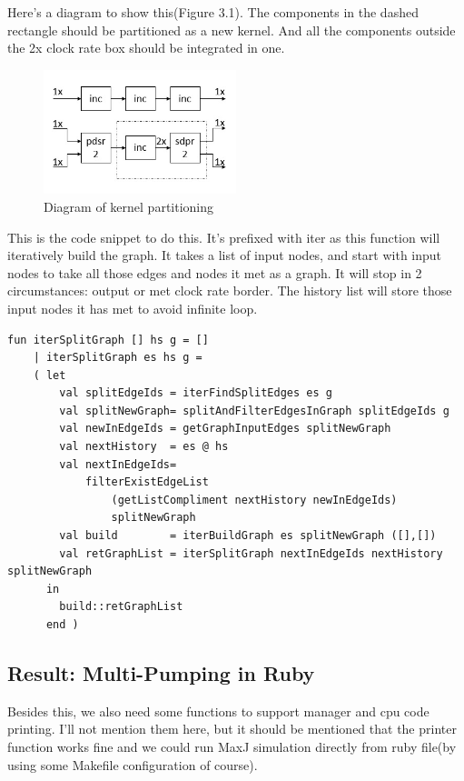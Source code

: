\documentclass[a4paper, 10pt]{report}
\begin{document}
Here's a diagram to show this(Figure 3.1). The components in the dashed rectangle should be partitioned as a new kernel. And all the components outside the 2x clock rate box should be integrated in one. 

\begin{figure}[h!]
  \caption{Diagram of kernel partitioning}
  \centering
    \includegraphics[width=0.5\textwidth]{pdsr}
\end{figure}

This is the code snippet to do this. It's prefixed with iter as this function will iteratively build the graph. It takes a list of input nodes, and start with input nodes to take all those edges and nodes it met as a graph. It will stop in 2 circumstances: output or met clock rate border. The history list will store those input nodes it has met to avoid infinite loop.

\begin{lstlisting}[caption=Iter partitioning algorithm]
fun iterSplitGraph [] hs g = []
    | iterSplitGraph es hs g =
    ( let 
        val splitEdgeIds = iterFindSplitEdges es g
        val splitNewGraph= splitAndFilterEdgesInGraph splitEdgeIds g
        val newInEdgeIds = getGraphInputEdges splitNewGraph
        val nextHistory  = es @ hs
        val nextInEdgeIds= 
			filterExistEdgeList 
				(getListCompliment nextHistory newInEdgeIds) 
				splitNewGraph
        val build        = iterBuildGraph es splitNewGraph ([],[])
        val retGraphList = iterSplitGraph nextInEdgeIds nextHistory splitNewGraph
      in 
        build::retGraphList
      end )
\end{lstlisting}

\subsection{Result: Multi-Pumping in Ruby}

Besides this, we also need some functions to support manager and cpu code printing. I'll not mention them here, but it should be mentioned that the printer function works fine and we could run MaxJ simulation directly from ruby file(by using some Makefile configuration of course).
\end{document}
